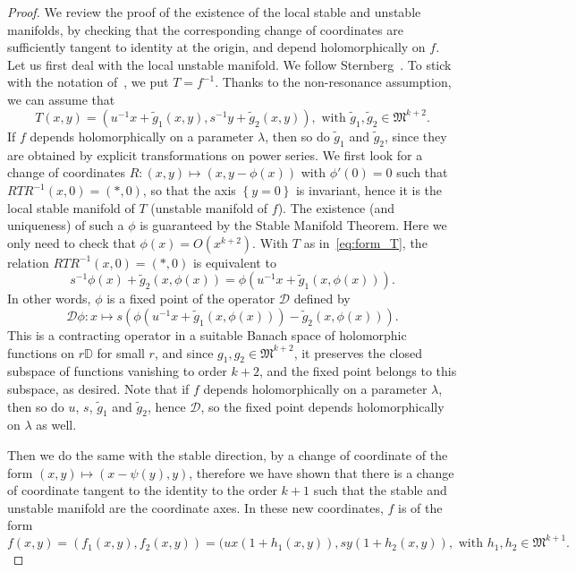 \documentclass[11pt, oneside]{amsart}
\newcommand{\D}{\mathbb{D}}
\newcommand{\fkm}{\mathfrak{M}}
\newcommand{\set}[1]{\left\{#1\right\}}
\newcommand{\lrpar}[1]{\left(#1\right)}
\newcommand{\inv}{^{-1}}
\theoremstyle{remark}
\theoremstyle{definition}
\theoremstyle{theorem}
\newcommand{\commentaire}[1]{}
\begin{document}
\begin{proof}
We review the proof of the existence of the local stable and unstable manifolds, by checking that the corresponding change of coordinates are sufficiently tangent to identity at the origin, and depend holomorphically on $f$.  Let us first deal with the local unstable manifold. We follow   Sternberg~\cite[Thms 7 to 9, \S 9]{sternberg1}. To stick with the notation of~\cite[p. 823]{sternberg1}, 
we put $T = f\inv$.  Thanks to the non-resonance assumption, we can assume that 
\begin{equation}\label{eq:form_T}
T(x,y) = (u\inv x + \tilde g_1(x,y), s\inv y + \tilde g_2 (x,y)), \text{ with } \tilde g_1, \tilde g_2\in \fkm ^{k+2}.
\end{equation}
\commentaire{added comment on holomorphic variation} If $f$ depends holomorphically on a parameter $\lambda$, 
then so do $\tilde g_1$ and $\tilde g_2$, since they are obtained by explicit transformations on power series. 
We first look for a change of coordinates  $R:(x,y)\mapsto (x, y-\phi(x))$ with $\phi'(0) = 0$
such that $RTR\inv(x,0) = (*, 0)$, so that the axis $\set{y=0}$ is invariant, hence it is 
 the local stable manifold of $T$ (unstable manifold of $f$). The existence (and uniqueness) of such a $\phi$ is guaranteed by the Stable Manifold Theorem. Here we only need to check that $\phi(x) = O(x^{k+2})$.  
With $T$ as in~\eqref{eq:form_T},
  the relation $RTR\inv(x,0) = (*, 0)$ is equivalent to 
 \begin{equation}
 s\inv \phi(x) + \tilde g_2(x,\phi(x)) = \phi(u\inv x + \tilde g_1(x, \phi(x))). 
 \end{equation}
In other words, $\phi$ is a fixed point of the operator $\mathcal D$ defined by 
\begin{equation}
\mathcal D \phi :x\longmapsto   s\lrpar{ \phi(u\inv x + \tilde g_1(x, \phi(x))) -\tilde g_2(x,\phi(x))  }. 
\end{equation}
This is a contracting operator in a suitable Banach space of holomorphic functions on $r\D$ for small $r$, and since $g_1, g_2 \in \fkm^{k+2}$, it preserves the closed subspace of functions vanishing to order 
$k+2$, and the fixed point belongs to this subspace, as desired. \commentaire{added comment on holomorphic variation} Note that
if $f$ depends holomorphically on a parameter $\lambda$, then so do 
  $u$, $s$, $\tilde g_1$ and $\tilde g_2$, hence $\mathcal D$, so the fixed point depends holomorphically on $\lambda$ as well. 

Then we do the same with the stable direction, by a change of coordinate of the form $(x,y)\mapsto (x-\psi(y), y)$, therefore we have shown  that there is a change of coordinate tangent to the identity to the order $k+1$ such that the stable and unstable manifold are the coordinate axes. In these new coordinates, $f$ is of the form
\begin{equation}
f(x,y) = (f_1(x,y), f_2(x,y))  = (ux(1+h_1(x,y)), sy(1+h_2(x,y)), \text{ with } h_1, h_2\in \fkm ^{k+1}. 
\end{equation}


\end{proof}
\end{document}

